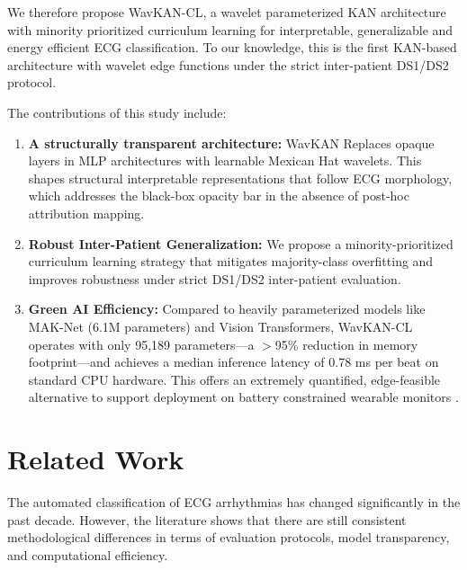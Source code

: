 \documentclass[pdflatex,sn-mathphys-num]{sn-jnl}
\theoremstyle{thmstyleone}
\theoremstyle{thmstyletwo}
\theoremstyle{thmstylethree}
\begin{document}
We therefore propose WavKAN-CL, a wavelet parameterized KAN architecture with minority prioritized curriculum learning for interpretable, generalizable and energy efficient ECG classification. To our knowledge, this is the first KAN-based architecture with wavelet edge functions under the strict inter-patient DS1/DS2 protocol.

The contributions of this study include:
\begin{enumerate}
    \item \textbf{A structurally transparent architecture:} WavKAN Replaces opaque layers in MLP architectures with learnable Mexican Hat wavelets. This shapes structural interpretable representations that follow ECG morphology, which addresses the black-box opacity bar in the absence of post-hoc attribution mapping.
    \item \textbf{Robust Inter-Patient Generalization:} We propose a minority-prioritized curriculum learning strategy that mitigates majority-class overfitting and improves robustness under strict DS1/DS2 inter-patient evaluation. 
    \item \textbf{Green AI Efficiency:} Compared to heavily parameterized models like MAK-Net (6.1M parameters) and Vision Transformers, WavKAN-CL operates with only 95,189 parameters---a $>$95\% reduction in memory footprint---and achieves a median inference latency of 0.78 ms per beat on standard CPU hardware. This offers an extremely quantified, edge-feasible alternative to support deployment on battery constrained wearable monitors \cite{farag_tiny_2023, elsheikhy_lightweight_2025}.
\end{enumerate}

\section{Related Work}
\label{sec:related_work}

The automated classification of ECG arrhythmias has changed significantly in the past decade. However, the literature shows that there are still consistent methodological differences in terms of evaluation protocols, model transparency, and computational efficiency.
\end{document}
